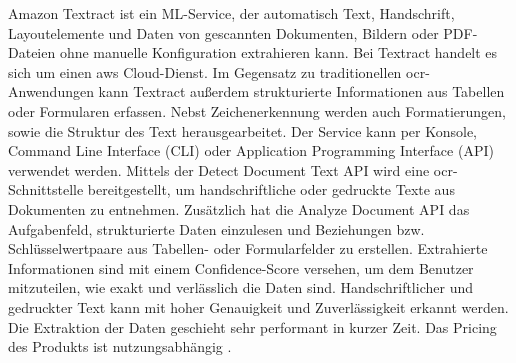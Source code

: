 Amazon Textract ist ein ML-Service, der automatisch Text, Handschrift, Layoutelemente und Daten von gescannten Dokumenten, Bildern oder PDF-Dateien ohne manuelle Konfiguration extrahieren kann. Bei Textract handelt es sich um einen \gls{aws} Cloud-Dienst. Im Gegensatz zu traditionellen \gls{ocr}-Anwendungen kann Textract außerdem strukturierte Informationen aus Tabellen oder Formularen erfassen. Nebst Zeichenerkennung werden auch Formatierungen, sowie die Struktur des Text herausgearbeitet. Der Service kann per Konsole, Command Line Interface (CLI) oder Application Programming Interface (API) verwendet werden. Mittels der Detect Document Text API wird eine \gls{ocr}-Schnittstelle bereitgestellt, um handschriftliche oder gedruckte Texte aus Dokumenten zu entnehmen. Zusätzlich hat die Analyze Document API das Aufgabenfeld, strukturierte Daten einzulesen und Beziehungen bzw. Schlüsselwertpaare aus Tabellen- oder Formularfelder zu erstellen. Extrahierte Informationen sind mit einem Confidence-Score versehen, um dem Benutzer mitzuteilen, wie exakt und verlässlich die Daten sind. Handschriftlicher und gedruckter Text kann mit hoher Genauigkeit und Zuverlässigkeit erkannt werden. Die Extraktion der Daten geschieht sehr performant in kurzer Zeit. Das Pricing des Produkts ist nutzungsabhängig \cite{textract}. \\

